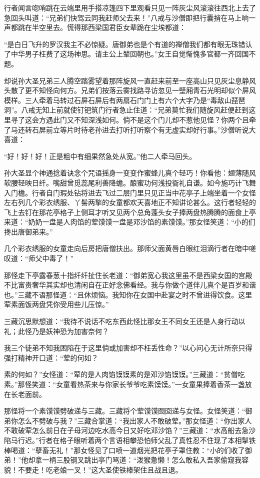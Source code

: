 \documentclass[12pt,UTF8]{ctexbook}
\begin{document}
行者闻言唿哨跳在云端里用手搭凉篷四下里观看只见一阵灰尘风滚滚往西北上去了急回头叫道：“兄弟们快驾云同我赶师父去来！”八戒与沙僧即把行囊捎在马上响一声都跳在半空里去。慌得那西梁国君臣女辈跪在尘埃都道：

“是白日飞升的罗汉我主不必惊疑。唐御弟也是个有道的禅僧我们都有眼无珠错认了中华男子枉费了这场神思。请主公上辇回朝也。”女王自觉惭愧多官都一齐回国不题。

却说孙大圣兄弟三人腾空踏雾望着那阵旋风一直赶来前至一座高山只见灰尘息静风头散了更不知怪向何方。兄弟们按落云雾找路寻访忽见一壁厢青石光明却似个屏风模样。三人牵着马转过石屏石屏后有两扇石门门上有六个大字乃是“毒敌山琵琶洞”。八戒无知上前就使钉钯筑门行者急止住道：“兄弟莫忙我们随旋风赶便赶到这里寻了这会方遇此门又不知深浅如何。倘不是这个门儿却不惹他见怪？你两个且牵了马还转石屏前立等片时待老孙进去打听打听察个有无虚实却好行事。”沙僧听说大喜道：

“好！好！好！正是粗中有细果然急处从宽。”他二人牵马回头。

孙大圣显个神通捻着诀念个咒语摇身一变变作蜜蜂儿真个轻巧！你看他：翅薄随风软腰轻映日纤。嘴甜曾觅蕊尾利善降蟾。酿蜜功何浅投衙礼自谦。如今施巧计飞舞入门檐。行者自门瑕处钻将进去飞过二层门里只见正当中花亭子上端坐着一个女怪左右列几个彩衣绣服、丫髻两揫的女童都欢天喜地正不知讲论甚么。这行者轻轻的飞上去钉在那花亭格子上侧耳才听又见两个总角蓬头女子捧两盘热腾腾的面食上亭来道：“奶奶一盘是人肉馅的荤馍馍一盘是邓沙馅的素馍馍。”那女怪笑道：“小的们搀出唐御弟来。”

几个彩衣绣服的女童走向后房把唐僧扶出。那师父面黄唇白眼红泪滴行者在暗中嗟叹道：“师父中毒了！”

那怪走下亭露春葱十指纤纤扯住长老道：“御弟宽心我这里虽不是西梁女国的宫殿不比富贵奢华其实却也清闲自在正好念佛看经。我与你做个道伴儿真个是百岁和谐也。”三藏不语那怪道：“且休烦恼。我知你在女国中赴宴之时不曾进得饮食。这里荤素面饭两盘凭你受用些儿压惊。”

三藏沉思默想道：“我待不说话不吃东西此怪比那女王不同女王还是人身行动以礼；此怪乃是妖神恐为加害奈何？

我三个徒弟不知我困陷在于这里倘或加害却不枉丢性命？”以心问心无计所奈只得强打精神开口道：“荤的何如？

素的何如？”女怪道：“荤的是人肉馅馍馍素的是邓沙馅馍馍。”三藏道：“贫僧吃素。”那怪笑道：“女童看热茶来与你家长爷爷吃素馍馍。”一女童果捧着香茶一盏放在长老面前。

那怪将一个素馍馍劈破递与三藏。三藏将个荤馍馍囫囵递与女怪。女怪笑道：“御弟你怎么不劈破与我？”三藏合掌道：“我出家人不敢破荤。”那女怪道：“你出家人不敢破荤怎么前日在子母河边吃水高今日又好吃邓沙馅？”三藏道：“水高船去急沙陷马行迟。”行者在格子眼听着两个言语相攀恐怕师父乱了真性忍不住现了本相掣铁棒喝道：“孽畜无礼！”那女怪见了口喷一道烟光把花亭子罩住教：“小的们收了御弟！”他却拿一柄三股钢叉跳出亭门骂道：“泼猴惫懒！怎么敢私入吾家偷窥我容貌！不要走！吃老娘一叉！”这大圣使铁棒架住且战且退。
\end{document}

